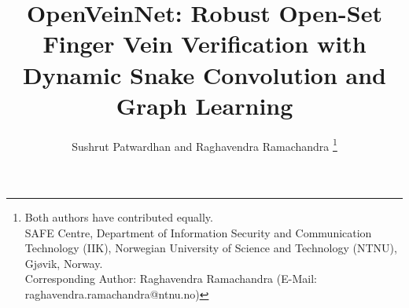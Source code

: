 \documentclass[10pt,journal,compsoc]{IEEEtran}
\begin{document}
%
\title{OpenVeinNet: Robust Open-Set Finger Vein Verification with Dynamic Snake Convolution and Graph Learning}
%
%
%
%

\author{Sushrut Patwardhan and
        Raghavendra Ramachandra%
\thanks{Both authors have contributed equally. \\
SAFE Centre, Department of Information Security and Communication Technology (IIK), Norwegian University of Science and Technology (NTNU), Gjøvik, Norway.  \\
            Corresponding Author: Raghavendra Ramachandra (E-Mail: raghavendra.ramachandra@ntnu.no)}}
\end{document}
